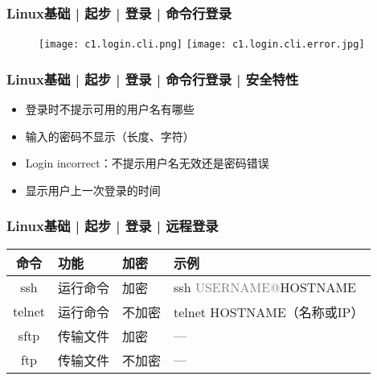 \begin{frame}
  \frametitle{Linux基础 | 起步 | 登录 | 命令行登录}
  \begin{figure}
    \centering
    \texttt{[image: c1.login.cli.png]}
    \vspace{0.1cm}
    \texttt{[image: c1.login.cli.error.jpg]}
  \end{figure}
\end{frame}

\begin{frame}
  \frametitle{Linux基础 | 起步 | 登录 | 命令行登录 | 安全特性}
  \begin{itemize}[<+->]
    \item 登录时不提示可用的用户名有哪些
    \item 输入的密码不显示（长度、字符）
    \item Login incorrect：不提示用户名无效还是密码错误
    \item 显示用户上一次登录的时间
  \end{itemize}
\end{frame}

\begin{frame}
  \frametitle{Linux基础 | 起步 | 登录 | 远程登录}
  \begin{table}
    \centering
    \begin{tabular}{clll}
      \hline
      \rowcolor{blue!50}命令 & 功能 & 加密 & 示例\\
      \hline
      \alert{ssh} & 运行命令 & 加密 & ssh \textcolor{gray}{USERNAME@}HOSTNAME\\
      telnet & 运行命令 & 不加密 & telnet HOSTNAME（名称或IP）\\
      sftp & 传输文件 & 加密 & ---\\
      ftp & 传输文件 & 不加密 & ---\\
      \hline
    \end{tabular}
  \end{table}
\end{frame}

